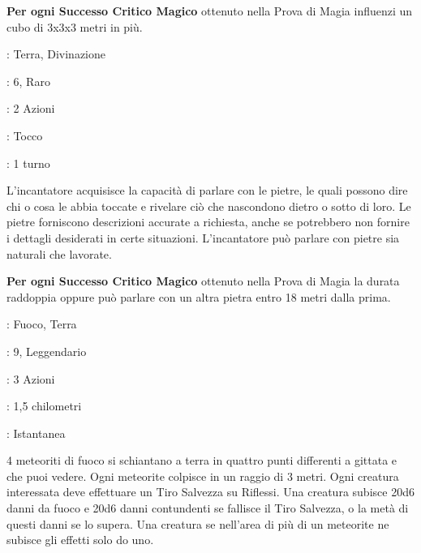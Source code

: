 \begin{multicols}{2}
\textbf{Per ogni Successo Critico Magico} ottenuto nella Prova di Magia influenzi un cubo di 3x3x3 metri in più.

\noindent\colorbox{OBSSgold!10}{
\begin{minipage}{0.95\linewidth}
\begin{description}[noitemsep, topsep=0pt, parsep=0pt, partopsep=0pt, leftmargin=0cm, labelwidth=1.3cm]
	\item[\textbf{Lista}]: Terra, Divinazione
	\item[\textbf{Livello}]: 6, Raro
	\item[\textbf{Lancio}]: 2 Azioni
	\item[\textbf{Gittata}]: Tocco
	\item[\textbf{Durata}]: 1 turno
\end{description}
\end{minipage}}\smallskip

L'incantatore acquisisce la capacità di parlare con le pietre, le quali possono dire chi o cosa le abbia toccate e rivelare ciò che nascondono dietro o sotto di loro. Le pietre forniscono descrizioni accurate a richiesta, anche se potrebbero non fornire i dettagli desiderati in certe situazioni. L'incantatore può parlare con pietre sia naturali che lavorate.

\textbf{Per ogni Successo Critico Magico} ottenuto nella Prova di Magia la durata raddoppia oppure può parlare con un altra pietra entro 18 metri dalla prima.

\hypertarget{sciamedimeteore}{}
\begin{description}[noitemsep, topsep=0pt, parsep=0pt, partopsep=0pt, leftmargin=0cm, labelwidth=1.3cm]
	\item[\textbf{Lista}]: Fuoco, Terra
	\item[\textbf{Livello}]: 9, Leggendario
	\item[\textbf{Lancio}]: 3 Azioni
	\item[\textbf{Gittata}]: 1,5 chilometri
	\item[\textbf{Durata}]: Istantanea
\end{description}

4 meteoriti di fuoco si schiantano a terra in quattro punti differenti a gittata e che puoi vedere. Ogni meteorite colpisce in un raggio di 3 metri. Ogni creatura interessata deve effettuare un Tiro Salvezza su Riflessi. Una creatura subisce 20d6 danni da fuoco e 20d6 danni contundenti se fallisce il Tiro Salvezza, o la metà di
questi danni se lo supera. Una creatura se nell'area di più di un meteorite ne subisce gli effetti solo do uno.


\end{multicols}
